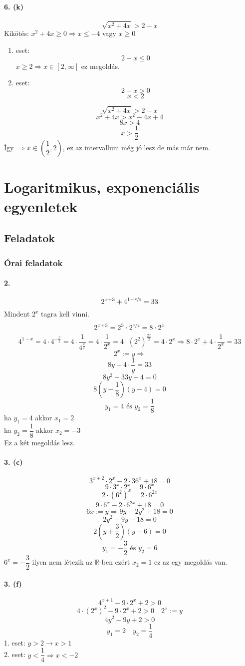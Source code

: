 \documentclass[12pt,a4paper,fleqn]{article}
\newcommand{\myparagraph}[1]{\paragraph{#1}\mbox{}}
\begin{document}
\myparagraph{6. (k)}
\[ \sqrt{x^2+4x} > 2-x \]
Kikötés: $ x^2 +4x \geq 0 \Rightarrow x \leq -4$ vagy $x \geq 0$
\begin{enumerate}
  \item eset:
    \[ 2-x \leq 0 \]
    $x \geq 2 \Rightarrow x \in [2, \infty]$ ez megoldás.
  \item eset:
    \[ 2-x > 0 \]
    \[ x < 2 \]
\end{enumerate}
\[ \sqrt{x^2+4x} > 2-x \]
\[ x^2 + 4x > x^2 - 4x +4 \]
\[ 8x > 4 \]
\[ x > \dfrac{1}{2} \]
Így $ \Rightarrow x \in \left(\dfrac{1}{2}, 2\right)$, ez az intervallum még jó
lesz de más már nem.


\section{Logaritmikus, exponenciális egyenletek}
\setcounter{subsection}{1}
\subsection{Feladatok}
\subsubsection{Órai feladatok}


\myparagraph{2.}
\[ 2^{x+3} + 4^{1-\nicefrac{x}{2}} = 33 \]
Mindent $2^x$ tagra kell vinni.
\[ 2^{x+3} = 2^3 \cdot 2^{\nicefrac{x}{2}} = 8 \cdot 2^x \]
\[ 4^{1-x} = 4 \cdot 4^{-\frac{x}{2}} = 4 \cdot \dfrac{1}{4^{\frac{x}{2}}} =
  4 \cdot \dfrac{1}{2^x} = 4 \cdot (2^2)^{\frac{2x}{2}} = 4 \cdot 2^x
    \Rightarrow 8 \cdot 2^x + 4 \cdot \dfrac{1}{2^x} = 33
\]
\[ 2^x := y \Rightarrow \]
\[ 8y + 4 \cdot \dfrac{1}{y} = 33 \]
\[ 8y^2 - 33y + 4 = 0 \]
\[ 8(y-\dfrac{1}{8})(y-4) =0 \]
\[ y_1 = 4 \text{ és } y_2 = \dfrac{1}{8} \]
ha $y_1 = 4$ akkor $x_1 = 2$ \\
ha $y_2 = \dfrac{1}{8}$ akkor $x_2 = -3$ \\
Ez a két megoldás lesz.


\myparagraph{3. (c)}
\[ 3^{x+2} \cdot 2^x - 2 \cdot 36^x + 18 = 0 \]
\[ 9 \cdot 3^x \cdot 2^x = 9 \cdot 6^x \]
\[ 2 \cdot (6^2)^x= 2 \cdot 6^{2x} \]
\[ 9 \cdot 6^x - 2 \cdot 6^{2x} + 18 = 0 \]
\[ 6x := y \Rightarrow 9y - 2y^2 + 18 = 0 \]
\[ 2y^2 - 9y - 18 = 0 \]
\[ 2(y+\dfrac{3}{2})(y-6) = 0 \]
\[ y_1=-\dfrac{3}{2} \text{ és } y_2 = 6 \]
$ 6^x = -\dfrac{3}{2}$ ilyen nem létezik az $\mathbb{R}$-ben ezért $ x_2 = 1 $
  ez az egy megoldás van.


\myparagraph{3. (f)}
\[ 4^{x+1} - 9 \cdot 2^x + 2 > 0 \]
\[ 4 \cdot (2^x)^2 - 9 \cdot 2^x + 2 > 0 \quad 2^x:=y\]
\[ 4y^2 - 9y + 2 > 0 \]
\[ y_1 = 2 \quad y_2 = \dfrac{1}{4} \]
1. eset: $y > 2 \rightarrow x > 1$ \\
2. eset: $y < \dfrac{1}{4} \Rightarrow x < -2 $
\end{document}
